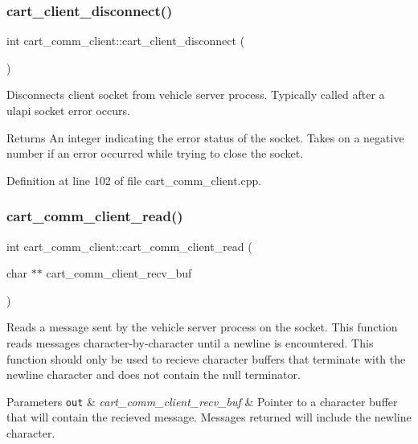 \subsubsection{\texorpdfstring{cart\+\_\+client\+\_\+disconnect()}{cart\_client\_disconnect()}}
{\footnotesize\ttfamily int cart\+\_\+comm\+\_\+client\+::cart\+\_\+client\+\_\+disconnect (\begin{DoxyParamCaption}{ }\end{DoxyParamCaption})}

Disconnects client socket from vehicle server process. Typically called after a ulapi socket error occurs. \begin{DoxyReturn}{Returns}
An integer indicating the error status of the socket. Takes on a negative number if an error occurred while trying to close the socket. 
\end{DoxyReturn}


Definition at line 102 of file cart\+\_\+comm\+\_\+client.\+cpp.

\mbox{\label{classcart__comm__client_a7292b453e9e24b73d48d3047a635d06c}} 
\subsubsection{\texorpdfstring{cart\+\_\+comm\+\_\+client\+\_\+read()}{cart\_comm\_client\_read()}}
{\footnotesize\ttfamily int cart\+\_\+comm\+\_\+client\+::cart\+\_\+comm\+\_\+client\+\_\+read (\begin{DoxyParamCaption}\item[{char $\ast$$\ast$}]{cart\+\_\+comm\+\_\+client\+\_\+recv\+\_\+buf }\end{DoxyParamCaption})}

Reads a message sent by the vehicle server process on the socket. This function reads messages character-\/by-\/character until a newline is encountered. This function should only be used to recieve character buffers that terminate with the newline character and does not contain the null terminator. 
\begin{DoxyParams}[1]{Parameters}
\mbox{\tt out}  & {\em cart\+\_\+comm\+\_\+client\+\_\+recv\+\_\+buf} & Pointer to a character buffer that will contain the recieved message. Messages returned will include the newline character. \\
\hline
\end{DoxyParams}


